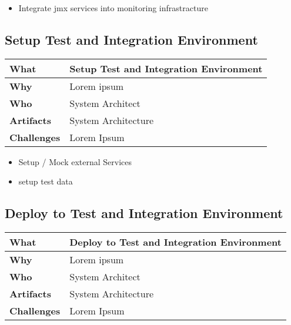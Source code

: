 \begin{itemize}
	\item Integrate jmx services into monitoring infrastracture
\end{itemize}

\subsection{Setup Test and Integration Environment}
\begin{minipage}{\textwidth}
 \label{table:ch6_Task_Setup_Test_Environment}
\begin{tabular}
	{|m{3cm}|m{10cm}|} \hline \bfseries What & Setup Test and Integration Environment\\
	\hline \bfseries Why & Lorem ipsum\\
	\hline \bfseries Who & System Architect\\
	\hline \bfseries Artifacts & System Architecture\\
	\hline \bfseries Challenges & Lorem Ipsum\\
	\hline 
\end{tabular}
\end{minipage}

\begin{itemize}
	\item Setup / Mock external Services
	\item setup test data
\end{itemize}

\subsection{Deploy to Test and Integration Environment}
\begin{minipage}{\textwidth}
 \label{table:ch6_Task_Deploy}
\begin{tabular}
	{|m{3cm}|m{10cm}|} \hline \bfseries What & Deploy to Test and Integration Environment\\
	\hline \bfseries Why & Lorem ipsum\\
	\hline \bfseries Who & System Architect\\
	\hline \bfseries Artifacts & System Architecture\\
	\hline \bfseries Challenges & Lorem Ipsum\\
	\hline 
\end{tabular}
\end{minipage}

